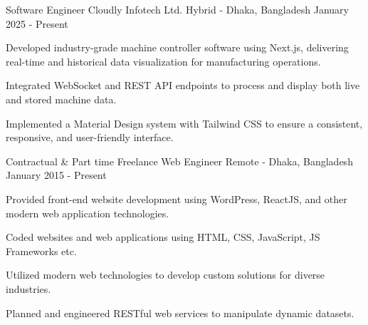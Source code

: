 

\begin{cventries}

    \cventry
        {Software Engineer}
        {Cloudly Infotech Ltd.}
        {Hybrid - Dhaka, Bangladesh}
        {January 2025 - Present}
        {
            \begin{cvitems}
                \item {Developed industry-grade machine controller software using Next.js, delivering real-time and historical data visualization for manufacturing operations.}
                \item {Integrated WebSocket and REST API endpoints to process and display both live and stored machine data.}
                \item {Implemented a Material Design system with Tailwind CSS to ensure a consistent, responsive, and user-friendly interface.}
            \end{cvitems}
        }

    \cventry
        {Contractual \& Part time}
        {Freelance Web Engineer}
        {Remote - Dhaka, Bangladesh}
        {January 2015 - Present}
        {
            \begin{cvitems}
                \item {Provided front-end website development using WordPress, ReactJS, and other modern web application technologies.}
                \item {Coded websites and web applications using HTML, CSS, JavaScript, JS Frameworks etc.}
                \item {Utilized modern web technologies to develop custom solutions for diverse industries.}
                \item {Planned and engineered RESTful web services to manipulate dynamic datasets.}
            \end{cvitems}
        }


\end{cventries}
